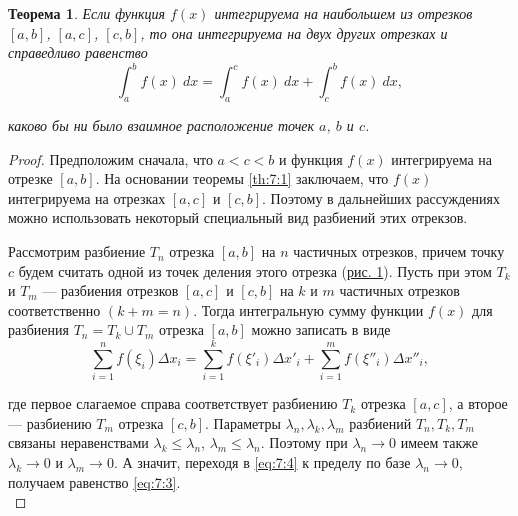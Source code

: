 \documentclass[12pt]{report}
\numberwithin{equation}{section}
\newtheorem{theorem}{Теорема}[section]
\begin{document}
\begin{theorem}
Если функция $f(x)$ интегрируема на наибольшем из отрезков $[a,b]$, $[a,c]$, $[c,b]$, то она интегрируема на двух других отрезках и справедливо равенство
\begin{equation}\label{eq:7:3}
\int_a^b f(x)~dx = \int_a^c f(x) ~dx + \int_c^b f(x)~dx, 
\end{equation}

каково бы ни было взаимное расположение точек $a$, $b$ и $c$.
\end{theorem}
\begin{proof}
Предположим сначала, что $a < c < b$ и функция $f(x)$  интегрируема на отрезке $[a,b]$. На основании теоремы \ref{th:7:1} заключаем, что $f(x)$ интегрируема на отрезках $[a,c]$ и $[c,b]$. Поэтому в дальнейших рассуждениях можно использовать некоторый специальный вид разбиений этих отрекзов.

\begin{center}
\end{center}

Рассмотрим разбиение $T_n$ отрезка $[a,b]$ на $n$ частичных отрезков, причем точку $c$ будем считать одной из точек деления этого отрезка (\hyperref[pic:7:1]{рис. 1}). Пусть при этом $T_k$ и $T_m$ --- разбиения отрезков $[a,c]$ и $[c,b]$ на $k$ и $m$ частичных отрезков соответственно $(k + m = n)$. Тогда интегральную сумму функции $f(x)$ для разбиения $T_n = T_k \cup T_m$ отрезка $[a,b]$ можно записать в виде
\begin{equation} \label{eq:7:4}
\sum_{i=1}^n f(\xi_i) \Delta x_i = \sum_{i=1}^k f(\xi'_i) \Delta x'_i + \sum_{i=1}^m f(\xi''_i) \Delta x''_i,
\end{equation}

где первое слагаемое справа соответствует разбиению $T_k$ отрезка $[a,c]$, а второе --- разбиению $T_m$ отрезка $[c,b]$. Параметры $\lambda_n, \lambda_k, \lambda_m$ разбиений $T_n, T_k, T_m$ связаны неравенствами $\lambda_k \leqslant \lambda_n$, $\lambda_m \leqslant \lambda_n$. Поэтому при $\lambda_n \to 0$ имеем также $\lambda_k \to 0$ и $\lambda_m \to 0$. А значит, переходя в \eqref{eq:7:4} к пределу по базе $\lambda_n \to 0$, получаем равенство \eqref{eq:7:3}.\\


\end{proof}
\end{document}
